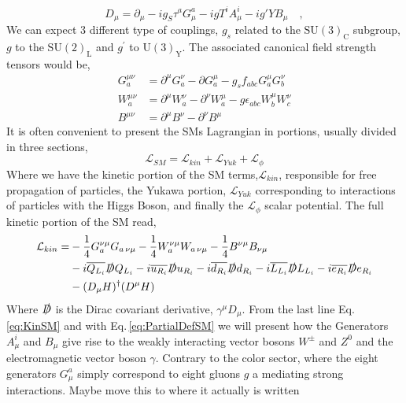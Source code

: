 %
\begin{equation}
\label{eq:PartialDefSM}
D_\mu = \partial_\mu - i g_S \tau^a G^a_\mu - i g T^i A^i_\mu - i g' Y B_\mu \quad ,  
\end{equation}  
%
We can expect 3 different type of couplings, $g_s$ related to the $\mathrm{SU(3)_C}$ subgroup, $g$ to the $\mathrm{SU(2)_L}$ and $g^\prime$ to $\mathrm{U(3)_Y}$. The associated canonical field strength tensors would be,
\begin{align}
G_a^{\mu \nu} & = \partial^\mu G^\nu_a - \partial G^\mu_a - g_s f_{abc} G_a^\mu G_b^\nu  \\ 
W_a^{\mu \nu} & = \partial^\mu W^\nu_a - \partial^\nu W^\mu_a  - g \epsilon_{abc} W^\mu_b W^\nu_c \\
B^{\mu \nu}   & = \partial^\mu B^\nu - \partial^\nu B^\mu 
\end{align}
It is often convenient to present the SMs Lagrangian in portions, usually divided in three sections,
\begin{equation}
\mathcal{L}_{SM} = \mathcal{L}_{kin}  +  \mathcal{L}_{Yuk} +  \mathcal{L}_{\phi} 	
\end{equation}
Where we have the kinetic portion of the SM terms,$\mathcal{L}_{kin}$, responsible for  free propagation of particles, the Yukawa portion, $\mathcal{L}_{Yuk}$  corresponding to interactions of particles with the Higgs Boson, and finally the $\mathcal{L}_{\phi}$ scalar potential. The full kinetic portion of the SM read, 
%
\begin{align}
\label{eq:KinSM}
\mathcal{L}_{kin} = & - \frac{1}{4} G^{\nu \mu}_a G_{a \,\nu \mu}  - \frac{1}{4}  W^{\nu \mu}_a W_{a \,\nu \mu}  
- \frac{1}{4}  B^{\nu \mu} B_{\nu \mu} \nonumber \\ 
 & -i \overline{Q_{L_i}} \slashed{D} Q_{L_i} 
   -i \overline{u_{R_i}} \slashed{D} u_{R_i}  
   -i \overline{d_{R_i}} \slashed{D} d_{R_i}  
   -i \overline{L_{L_i}} \slashed{D} L_{L_i}    
   -i \overline{e_{R_i}} \slashed{D} e_{R_i}   \\
 & - (D_\mu H)^\dagger ( D^\mu H )   \nonumber 
\end{align}
Where $\slashed{D}$ is the Dirac covariant derivative, $\gamma^\mu D_\mu$. { \color{gray} From the last line Eq.\,\ref{eq:KinSM} and with Eq.\,\ref{eq:PartialDefSM} we will present how the Generators $A^i_\mu$ and $B_\mu$ give rise to the weakly interacting vector bosons $W^\pm$ and $Z^0$ and the electromagnetic vector boson $\gamma$. Contrary to the color sector, where the eight generators $G^a_\mu$ simply correspond to eight gluons $g$ a mediating strong interactions. } { \color{blue} Maybe move this to where it actually is written } 
